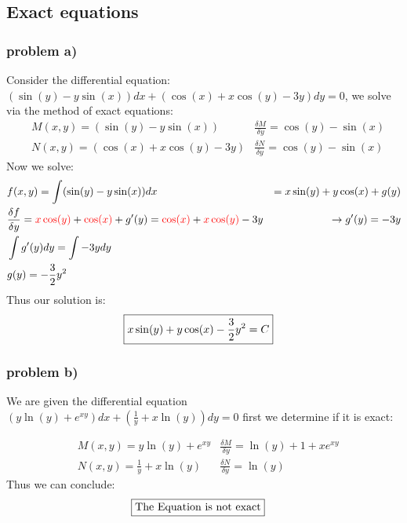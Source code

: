 \documentclass{article}
\begin{document}
\pagestyle{fancy}

\setcounter{section}{2}
\setcounter{subsection}{3}
\setcounter{subsubsection}{0}

\subsection{Exact equations}
\subsubsection{problem a)}
Consider the differential equation: $(\sin(y) - y\sin(x))dx + (\cos(x) + x\cos(y) - 3y)dy = 0$, we solve via the method of exact equations:
\begin{align*}
    & M(x,y) = (\sin(y) - y\sin(x)) & \frac{\delta M}{\delta y} = \cos(y) - \sin(x)\\
    & N(x,y) = (\cos(x) + x\cos(y) - 3y) & \frac{\delta N}{\delta y} = \cos(y) - \sin(x)
\end{align*}
Now we solve:
\begin{align}
    & f(x,y) = \int(\sin(y) - y\sin(x))dx & = x\sin(y) + y\cos(x) + g(y)\\
     &\frac{\delta f}{\delta y} = \textcolor{red}{x\cos(y)} + \textcolor{red}{\cos(x)} + g'(y) =
     \textcolor{red}{\cos(x)} + \textcolor{red}{x\cos(y)} - 3y & \rightarrow  g'(y) = -3y\\
     & \int g'(y)dy = \int -3ydy\\
     & g(y) = -\frac{3}{2}y^2
\end{align}
Thus our solution is:
\begin{align}
     \Aboxed{x\sin(y) + y\cos(x) - \frac{3}{2}y^2 = C}
\end{align}



\setcounter{subsubsection}{0}\subsubsection{problem b)}
We are given the differential equation $ (y\ln(y) + e^{xy})dx + (\frac{1}{y} + x\ln(y))dy = 0 $ first we determine if it is exact: 

\setcounter{equation}{0}
\begin{align*}
    &M(x,y) = y\ln(y) + e^{xy} & \frac{\delta M}{\delta y} = \ln(y) + 1 + xe^{xy}\\
    &N(x,y) = \frac{1}{y} + x\ln(y) & \frac{\delta N}{\delta y} = \ln(y)
\end{align*}
Thus we can conclude:
\begin{align*}
    \Aboxed{\text{The Equation is not exact}}
\end{align*}\setcounter{equation}{0}
\end{document}

